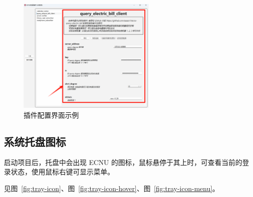 \documentclass[14pt,a4paper,UTF8,twoside]{article}
\begin{document}
\begin{figure}[H]
    \centering
    \includegraphics[width=0.6\textwidth]{img/plugin_config_gui}
    \caption{插件配置界面示例}
    \label{fig:plugin-config-gui}
\end{figure}

\newpage{}

\subsection{系统托盘图标}

启动项目后，托盘中会出现 ECNU 的图标，鼠标悬停于其上时，可查看当前的登录状态，使用鼠标右键可显示菜单。

见图\ \ref{fig:tray-icon}、图\ \ref{fig:tray-icon-hover}、图\ \ref{fig:tray-icon-menu}。
\end{document}
